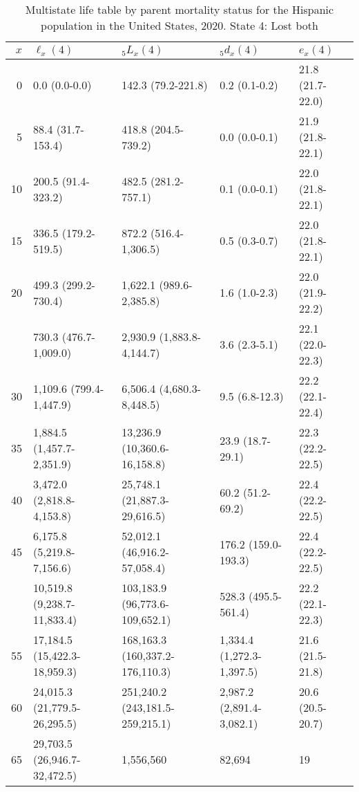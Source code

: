 \begin{table}

\caption{Multistate life table by parent mortality status for the Hispanic population in the United States, 2020. State 4: Lost both}
\centering
\begin{tabular}[t]{rllll}
\toprule
$x$ & $\ell_x(4)$ & ${}_5 L_x(4)$ & ${}_5 d_x(4)$ & $e_x(4)$\\
\midrule
0 & 0.0 (0.0-0.0) & 142.3 (79.2-221.8) & 0.2 (0.1-0.2) & 21.8 (21.7-22.0)\\
5 & 88.4 (31.7-153.4) & 418.8 (204.5-739.2) & 0.0 (0.0-0.1) & 21.9 (21.8-22.1)\\
10 & 200.5 (91.4-323.2) & 482.5 (281.2-757.1) & 0.1 (0.0-0.1) & 22.0 (21.8-22.1)\\
15 & 336.5 (179.2-519.5) & 872.2 (516.4-1,306.5) & 0.5 (0.3-0.7) & 22.0 (21.8-22.1)\\
20 & 499.3 (299.2-730.4) & 1,622.1 (989.6-2,385.8) & 1.6 (1.0-2.3) & 22.0 (21.9-22.2)\\
\addlinespace
25 & 730.3 (476.7-1,009.0) & 2,930.9 (1,883.8-4,144.7) & 3.6 (2.3-5.1) & 22.1 (22.0-22.3)\\
30 & 1,109.6 (799.4-1,447.9) & 6,506.4 (4,680.3-8,448.5) & 9.5 (6.8-12.3) & 22.2 (22.1-22.4)\\
35 & 1,884.5 (1,457.7-2,351.9) & 13,236.9 (10,360.6-16,158.8) & 23.9 (18.7-29.1) & 22.3 (22.2-22.5)\\
40 & 3,472.0 (2,818.8-4,153.8) & 25,748.1 (21,887.3-29,616.5) & 60.2 (51.2-69.2) & 22.4 (22.2-22.5)\\
45 & 6,175.8 (5,219.8-7,156.6) & 52,012.1 (46,916.2-57,058.4) & 176.2 (159.0-193.3) & 22.4 (22.2-22.5)\\
\addlinespace
50 & 10,519.8 (9,238.7-11,833.4) & 103,183.9 (96,773.6-109,652.1) & 528.3 (495.5-561.4) & 22.2 (22.1-22.3)\\
55 & 17,184.5 (15,422.3-18,959.3) & 168,163.3 (160,337.2-176,110.3) & 1,334.4 (1,272.3-1,397.5) & 21.6 (21.5-21.8)\\
60 & 24,015.3 (21,779.5-26,295.5) & 251,240.2 (243,181.5-259,215.1) & 2,987.2 (2,891.4-3,082.1) & 20.6 (20.5-20.7)\\
65 & 29,703.5 (26,946.7-32,472.5) & 1,556,560 & 82,694 & 19\\
\bottomrule
\end{tabular}
\end{table}